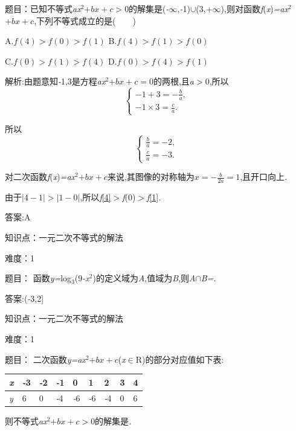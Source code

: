 \documentclass{article} %
\begin{document}
 题目：已知不等式\textit{ax}${}^{2}$\textit{$+bx+c>$}0的解集是(\textit{-$\infty$},\textit{-}1)$\mathrm{\cup}$(3,\textit{$+\infty$}),则对函数\textit{f}(\textit{x})\textit{=ax}${}^{2}$\textit{$+bx+c$},下列不等式成立的是(\textit{　　})

 A.$f(4)>f(0)>f(1)$ B.$f(4)>f(1)>f(0)$

 C.$f(0)>f(1)>f(4)$ D.$f(0)>f(4)>f(1)$

 解析:由题意知\textit{-}1,3是方程\textit{ax}${}^{2}$\textit{$+bx+c=$}0的两根,且\textit{a$>$}0,所以
\[
\begin{cases}
-1+3 = -\frac{b}{a},\\
-1 \times 3 = \frac{c}{a}.
\end{cases}
\]

所以
\[
\begin{cases}
\frac{b}{a} = -2,\\
\frac{c}{a}=-3.
\end{cases}
\]


对二次函数\textit{f}(\textit{x})\textit{=ax}${}^{2}$\textit{$+bx+c$}来说,其图像的对称轴为$ x = -\frac{b}{2a}=1$,且开口向上\textit{.}

由于$  |4-1|>|1-0|$,所以\textit{f}\eqref{4}\textit{$>$f}(0)\textit{$>$f}\eqref{1}\textit{.}

 答案:A


知识点：一元二次不等式的解法

难度：1


 题目： 函数\textit{y=}log${}_{3}$(9\textit{-x}${}^{2}$)的定义域为\textit{A},值域为\textit{B},则\textit{A}$\mathrm{\cap}$\textit{B=\underbar{　　　　　}.~}

 答案:(\textit{-}3,2]


知识点：一元二次不等式的解法

难度：1

 题目： 二次函数\textit{y=ax}${}^{2}$\textit{$+bx+c$}(\textit{x}$\mathrm{\in}$R)的部分对应值如下表:

\begin{tabular}{|p{0.2in}|p{0.3in}|p{0.3in}|p{0.3in}|p{0.3in}|p{0.3in}|p{0.3in}|p{0.2in}|p{0.2in}|} \hline 
	\textit{x} & \textit{-}3 & \textit{-}2 & \textit{-}1 & 0 & 1 & 2 & 3 & 4 \\ \hline 
	\textit{y} & 6 & 0 & \textit{-}4 & \textit{-}6 & \textit{-}6 & \textit{-}4 & 0 & 6 \\ \hline 
\end{tabular}

 则不等式\textit{ax}${}^{2}$\textit{$+bx+c>$}0的解集是\textit{\underbar{　　　　　　　}.~}
\end{document}
